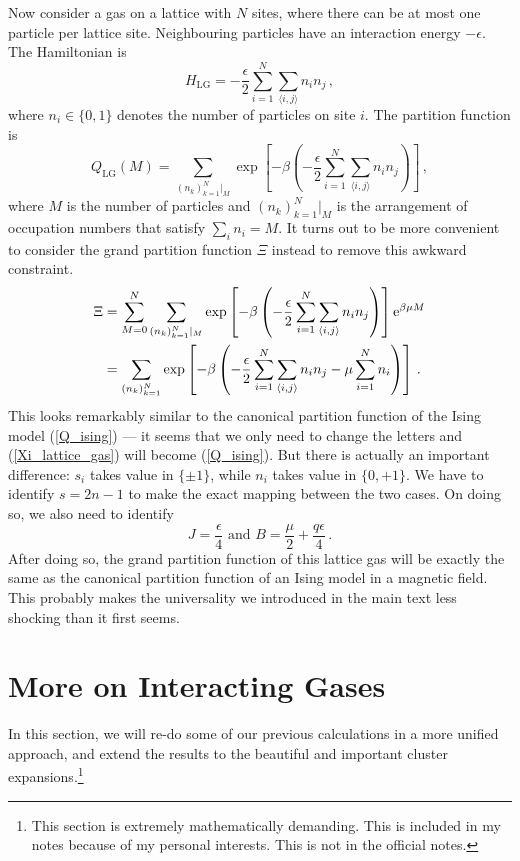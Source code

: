 \documentclass{article}
\theoremstyle{plain}\theoremheaderfont{\normalfont\bfseries}\theorembodyfont{\rmfamily}\theoremseparator{.}\newtheorem*{thm}{Theorem}\newtheorem*{law}{Law}\newtheorem*{pos}{Postulate}
\numberwithin{equation}{section}
\newcommand{\ee}{\mathrm{e}}
\begin{document}
    Now consider a gas on a lattice with \(N\) sites, where there can be at most one particle per lattice site. Neighbouring particles have an interaction energy \(-\epsilon\). The Hamiltonian is
    \begin{equation}
        H_{\text{LG}}=-\frac{\epsilon}{2}\sum_{i=1}^{N}\sum_{\langle i,j\rangle}n_in_j\,,
    \end{equation}
    where \(n_i\in\{0,1\}\) denotes the number of particles on site \(i\). The partition function is
    \begin{equation}
        Q_{\text{LG}}(M)=\sum_{(n_k)_{k=1}^{N}|_M}\exp\left[-\beta\left(-\frac{\epsilon}{2}\sum_{i=1}^{N}\sum_{\langle i,j\rangle}n_in_j\right)\right]\,,
    \end{equation}
    where \(M\) is the number of particles and \((n_k)_{k=1}^{N}|_M\) is the arrangement of occupation numbers that satisfy \(\sum_i n_i=M\). It turns out to be more convenient to consider the grand partition function \(\Xi\) instead to remove this awkward constraint.
    \begin{align}
        \Xi&=\sum_{M=0}^{N}\sum_{(n_k)_{k=1}^{N}|_M}\exp\left[-\beta\left(-\frac{\epsilon}{2}\sum_{i=1}^{N}\sum_{\langle i,j\rangle}n_in_j\right)\right]\ee^{\beta\mu M} \notag \\
        &=\sum_{(n_k)_{k=1}^{N}}\exp\left[-\beta\left(-\frac{\epsilon}{2}\sum_{i=1}^{N}\sum_{\langle i,j\rangle}n_in_j-\mu\sum_{i=1}^{N}n_i\right)\right]\,. \label{Xi_lattice_gas}
    \end{align}
    This looks remarkably similar to the canonical partition function of the Ising model (\ref{Q_ising}) --- it seems that we only need to change the letters and (\ref{Xi_lattice_gas}) will become (\ref{Q_ising}). But there is actually an important difference: \(s_i\) takes value in \(\{\pm 1\}\), while \(n_i\) takes value in \(\{0,+1\}\). We have to identify \(s=2n-1\) to make the exact mapping between the two cases. On doing so, we also need to identify
    \begin{equation}
        J=\frac{\epsilon}{4} \text{ and }B=\frac{\mu}{2}+\frac{q\epsilon}{4}\,.
    \end{equation}
    After doing so, the grand partition function of this lattice gas will be exactly the same as the canonical partition function of an Ising model in a magnetic field. This probably makes the universality we introduced in the main text less shocking than it first seems.

    \section{More on Interacting Gases}\label{Chap:Cluster_Expansion}
    In this section, we will re-do some of our previous calculations in a more unified approach, and extend the results to the beautiful and important cluster expansions.\footnote{This section is extremely mathematically demanding. This is included in my notes because of my personal interests. This is not in the official notes.}
\end{document}
